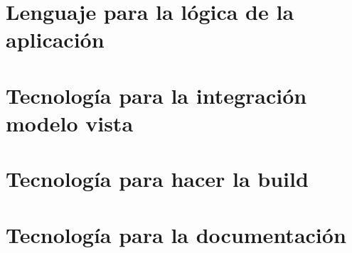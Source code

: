 
\section{Lenguaje para la lógica de la aplicación}
\label{3:sec1}


\section{Tecnología para la integración modelo vista}
\label{3:sec2}


\section{Tecnología para hacer la build}
\label{3:sec3}


\section{Tecnología para la documentación}
\label{3:sec4}

